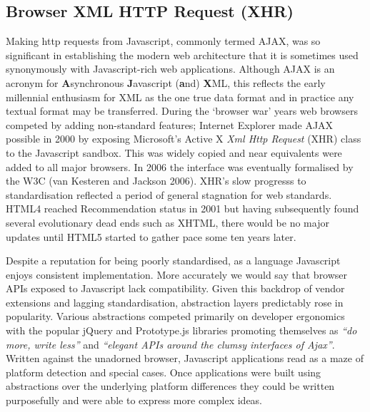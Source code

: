 \documentclass[12pt, ]{article}
\begin{document}
\subsection{Browser XML HTTP Request
(XHR)}\label{browser-xml-http-request-xhr}

Making http requests from Javascript, commonly termed AJAX, was so
significant in establishing the modern web architecture that it is
sometimes used synonymously with Javascript-rich web applications.
Although AJAX is an acronym for \textbf{A}synchronous
\textbf{J}avascript (\textbf{a}nd) \textbf{X}ML, this reflects the early
millennial enthusiasm for XML as the one true data format and in
practice any textual format may be transferred. During the `browser war'
years web browsers competed by adding non-standard features; Internet
Explorer made AJAX possible in 2000 by exposing Microsoft's Active X
\emph{Xml Http Request} (XHR) class to the Javascript sandbox. This was
widely copied and near equivalents were added to all major browsers. In
2006 the interface was eventually formalised by the W3C (van Kesteren
and Jackson 2006). XHR's slow progresss to standardisation reflected a
period of general stagnation for web standards. HTML4 reached
Recommendation status in 2001 but having subsequently found several
evolutionary dead ends such as XHTML, there would be no major updates
until HTML5 started to gather pace some ten years later.

Despite a reputation for being poorly standardised, as a language
Javascript enjoys consistent implementation. More accurately we would
say that browser APIs exposed to Javascript lack compatibility. Given
this backdrop of vendor extensions and lagging standardisation,
abstraction layers predictably rose in popularity. Various abstractions
competed primarily on developer ergonomics with the popular jQuery and
Prototype.js libraries promoting themselves as \emph{``do more, write
less''} and \emph{``elegant APIs around the clumsy interfaces of
Ajax''}. Written against the unadorned browser, Javascript applications
read as a maze of platform detection and special cases. Once
applications were built using abstractions over the underlying platform
differences they could be written purposefully and were able to express
more complex ideas.
\end{document}
